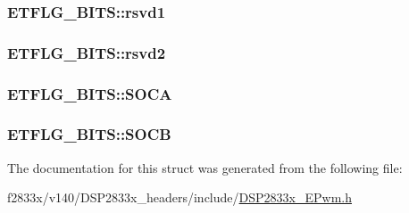 \subsubsection[{rsvd1}]{ E\+T\+F\+L\+G\+\_\+\+B\+I\+T\+S\+::rsvd1}\label{struct_e_t_f_l_g___b_i_t_s_aebc56841c14c0d1f7fac4f397c930da9}
\hypertarget{struct_e_t_f_l_g___b_i_t_s_a621c11cb01aaa555f250930a51e7cf14}{}
\subsubsection[{rsvd2}]{ E\+T\+F\+L\+G\+\_\+\+B\+I\+T\+S\+::rsvd2}\label{struct_e_t_f_l_g___b_i_t_s_a621c11cb01aaa555f250930a51e7cf14}
\hypertarget{struct_e_t_f_l_g___b_i_t_s_a45fdebff1773a7f73574963b8da39dc1}{}
\subsubsection[{S\+O\+C\+A}]{ E\+T\+F\+L\+G\+\_\+\+B\+I\+T\+S\+::\+S\+O\+C\+A}\label{struct_e_t_f_l_g___b_i_t_s_a45fdebff1773a7f73574963b8da39dc1}
\hypertarget{struct_e_t_f_l_g___b_i_t_s_a6df3e745fc78633079eb9529c2f00b6d}{}
\subsubsection[{S\+O\+C\+B}]{ E\+T\+F\+L\+G\+\_\+\+B\+I\+T\+S\+::\+S\+O\+C\+B}\label{struct_e_t_f_l_g___b_i_t_s_a6df3e745fc78633079eb9529c2f00b6d}


The documentation for this struct was generated from the following file\+:\begin{DoxyCompactItemize}
\item 
f2833x/v140/\+D\+S\+P2833x\+\_\+headers/include/\hyperlink{_d_s_p2833x___e_pwm_8h}{D\+S\+P2833x\+\_\+\+E\+Pwm.\+h}\end{DoxyCompactItemize}
